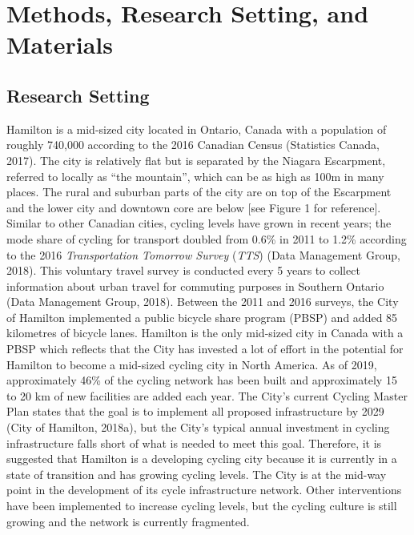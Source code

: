 \documentclass[]{elsarticle} %
\begin{document}
\hypertarget{sec:methods}{%
\section{Methods, Research Setting, and Materials}\label{sec:methods}}

\hypertarget{research-setting}{%
\subsection{Research Setting}\label{research-setting}}

Hamilton is a mid-sized city located in Ontario, Canada with a
population of roughly 740,000 according to the 2016 Canadian Census
(Statistics Canada, 2017). The city is relatively flat but is separated
by the Niagara Escarpment, referred to locally as ``the mountain'',
which can be as high as 100m in many places. The rural and suburban
parts of the city are on top of the Escarpment and the lower city and
downtown core are below {[}see Figure 1 for reference{]}. Similar to
other Canadian cities, cycling levels have grown in recent years; the
mode share of cycling for transport doubled from 0.6\% in 2011 to 1.2\%
according to the 2016 \emph{Transportation Tomorrow Survey} (\emph{TTS})
(Data Management Group, 2018). This voluntary travel survey is conducted
every 5 years to collect information about urban travel for commuting
purposes in Southern Ontario (Data Management Group, 2018). Between the
2011 and 2016 surveys, the City of Hamilton implemented a public bicycle
share program (PBSP) and added 85 kilometres of bicycle lanes. Hamilton
is the only mid-sized city in Canada with a PBSP which reflects that the
City has invested a lot of effort in the potential for Hamilton to
become a mid-sized cycling city in North America. As of 2019,
approximately 46\% of the cycling network has been built and
approximately 15 to 20 km of new facilities are added each year. The
City's current Cycling Master Plan states that the goal is to implement
all proposed infrastructure by 2029 (City of Hamilton, 2018a), but the
City's typical annual investment in cycling infrastructure falls short
of what is needed to meet this goal. Therefore, it is suggested that
Hamilton is a developing cycling city because it is currently in a state
of transition and has growing cycling levels. The City is at the mid-way
point in the development of its cycle infrastructure network. Other
interventions have been implemented to increase cycling levels, but the
cycling culture is still growing and the network is currently
fragmented.
\end{document}
